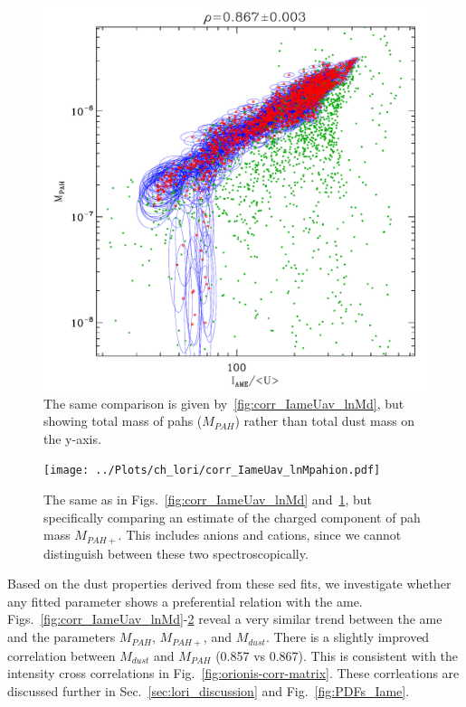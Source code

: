              \begin{figure}
                \includegraphics[width=\textwidth]{../Plots/ch_lori/corr_IameUav_lnMpah.pdf}
                \centering
                \caption{The same comparison is given by~\ref{fig:corr_IameUav_lnMd}, but showing total mass of \gls{pah}s ($M_{PAH}$) rather than total dust mass on the y-axis. }
                \label{fig:corr_IameUav_lnMpah}
              \end{figure}
              \begin{figure}
                \texttt{[image: ../Plots/ch\_lori/corr\_IameUav\_lnMpahion.pdf]}
                \centering
                \caption{ The same as in Figs.~\ref{fig:corr_IameUav_lnMd} and~\ref{fig:corr_IameUav_lnMpah}, but specifically comparing an estimate of the charged component of \gls{pah} mass $M_{PAH+}$. This includes anions and cations, since we cannot distinguish between these two spectroscopically.}
                \label{fig:corr_IameUav_lnMpahion}
              \end{figure}
    Based on the dust properties derived from these \gls{sed} fits, we investigate whether any fitted parameter shows a preferential relation with the \gls{ame}. Figs.~\ref{fig:corr_IameUav_lnMd}-\ref{fig:corr_IameUav_lnMpahion} reveal a very similar trend between the \gls{ame} and the parameters $M_{PAH}$, $M_{PAH+}$, and $M_{dust}$. There is a slightly improved correlation between $M_{dust}$ and $M_{PAH}$ (0.857 vs 0.867). This is consistent with the intensity cross correlations in Fig.~\ref{fig:orionis-corr-matrix}. These corrleations are discussed further in Sec.~\ref{sec:lori_discussion} and Fig.~\ref{fig:PDFs_Iame}.

